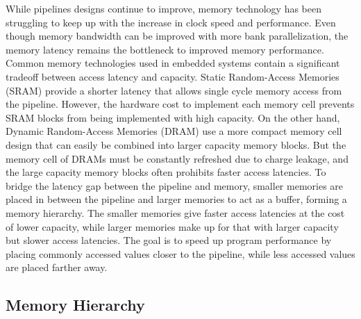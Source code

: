While pipelines designs continue to improve, memory technology has been struggling to keep up with the increase in clock speed and performance.
Even though memory bandwidth can be improved with more bank parallelization, the memory latency remains the bottleneck to improved memory performance.
Common memory technologies used in embedded systems contain a significant tradeoff between access latency and capacity. 
Static Random-Access Memories (SRAM) provide a shorter latency that allows single cycle memory access from the pipeline.
However, the hardware cost to implement each memory cell prevents SRAM blocks from being implemented with high capacity.
On the other hand, Dynamic Random-Access Memories (DRAM) use a more compact memory cell design that can easily be combined into larger capacity memory blocks.
But the memory cell of DRAMs must be constantly refreshed due to charge leakage, and the large capacity memory blocks often prohibits faster access latencies.
To bridge the latency gap between the pipeline and memory, smaller memories are placed in between the pipeline and larger memories to act as a buffer, forming a memory hierarchy.
The smaller memories give faster access latencies at the cost of lower capacity, while larger memories make up for that with larger capacity but slower access latencies. 
The goal is to speed up program performance by placing commonly accessed values closer to the pipeline, while less accessed values are placed farther away.

\subsection{Memory Hierarchy}
